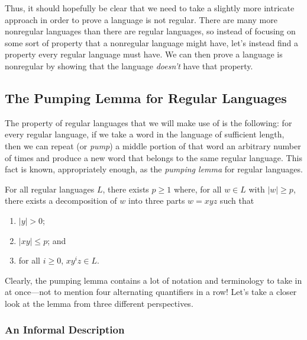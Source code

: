 Thus, it should hopefully be clear that we need to take a slightly more intricate approach in order to prove a language is not regular. There are many more nonregular languages than there are regular languages, so instead of focusing on some sort of property that a nonregular language might have, let's instead find a property every regular language must have. We can then prove a language is nonregular by showing that the language \emph{doesn't} have that property.

\subsection{The Pumping Lemma for Regular Languages}

The property of regular languages that we will make use of is the following: for every regular language, if we take a word in the language of sufficient length, then we can repeat (or \emph{pump}) a middle portion of that word an arbitrary number of times and produce a new word that belongs to the same regular language. This fact is known, appropriately enough, as the \emph{pumping lemma} for regular languages.

\begin{lemma}\label{lem:pumpingregular}
For all regular languages $L$, there exists $p \geq 1$ where, for all $w \in L$ with $|w| \geq p$, there exists a decomposition of $w$ into three parts $w = xyz$ such that
\begin{enumerate}
\item $|y| > 0$;
\item $|xy| \leq p$; and
\item for all $i \geq 0$, $xy^{i}z \in L$.
\end{enumerate}
\end{lemma}

Clearly, the pumping lemma contains a lot of notation and terminology to take in at once---not to mention four alternating quantifiers in a row! Let's take a closer look at the lemma from three different perspectives.

\subsubsection*{An Informal Description}

